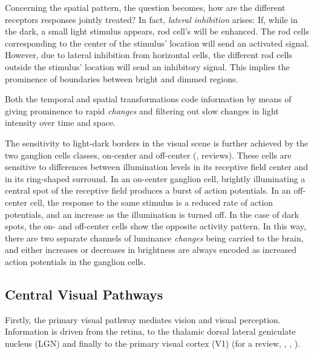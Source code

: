 Concerning the spatial pattern, the question becomes, how are the different receptors responses jointly treated? In fact, \textit{lateral inhibition} arises: If, while in the dark, a small light stimulus appears, rod cell's will be enhanced. The rod cells corresponding to the center of the stimulus' location will send an activated signal. However, due to lateral inhibition from horizontal cells, the different rod cells outside the stimulus' location will send an inhibitory signal. This implies the prominence of boundaries between bright and dimmed regions.

Both the temporal and spatial transformations code information by means of giving prominence to rapid \textit{changes} and filtering out slow changes in light intensity over time and space. 

The sensitivity to light-dark borders in the visual scene is further achieved by the two ganglion cells classes, on-center and off-center (\cite{Purves}, \cite{Kandel} reviews). These cells are sensitive to differences between illumination levels in its receptive field center and in its ring-shaped surround. In an on-center ganglion cell, brightly illuminating a central spot of the receptive field produces a burst of action potentials. In an off-center cell, the response to the same stimulus is a reduced rate of action potentials, and an increase as the illumination is turned off. In the case of dark spots, the on- and off-center cells show the opposite activity pattern. In this way, there are two separate channels of luminance \textit{changes} being carried to the brain, and either increases or decreases in brightness are always encoded as increased action potentials in the ganglion cells.






\subsection{Central Visual Pathways}

Firstly, the primary visual pathway mediates vision and visual perception. Information is driven from the retina, to the thalamic dorsal lateral geniculate nucleus (LGN) and finally to the primary visual cortex (V1) (for a review, \cite{Purves}, \cite{Kandel}, \cite{Bear}).%

